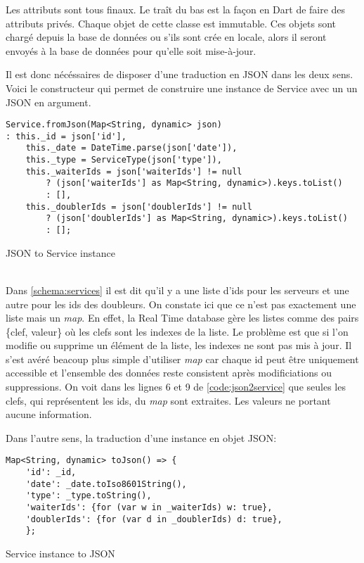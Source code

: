 Les attributs sont tous finaux. Le traît du bas est la façon en Dart de faire des attributs privés. Chaque objet de cette classe est immutable. Ces objets sont chargé depuis la base de données ou s'ils sont crée en locale, alors il seront envoyés à la base de données pour qu'elle soit mise-à-jour. 

Il est donc nécéssaires de disposer d'une traduction en JSON dans les deux sens. Voici le constructeur qui permet de construire une instance de Service avec un un JSON en argument.\\
\begin{listing}[!h]
\begin{verbatim}
Service.fromJson(Map<String, dynamic> json)
: this._id = json['id'],
    this._date = DateTime.parse(json['date']),
    this._type = ServiceType(json['type']),
    this._waiterIds = json['waiterIds'] != null
        ? (json['waiterIds'] as Map<String, dynamic>).keys.toList()
        : [],
    this._doublerIds = json['doublerIds'] != null
        ? (json['doublerIds'] as Map<String, dynamic>).keys.toList()
        : [];
\end{verbatim}
\caption{JSON to Service instance}
\label{code:json2service}
\end{listing}\\
Dans \ref{schema:services} il est dit qu'il y a une liste d'ids pour les serveurs et une autre pour les ids des doubleurs. On constate ici que ce n'est pas exactement une liste mais un \textit{map}. En effet, la Real Time database gère les listes comme des pairs \{clef, valeur\} où les clefs sont les indexes de la liste. Le problème est que si l'on modifie ou supprime un élément de la liste, les indexes ne sont pas mis à jour. Il s'est avéré beacoup plus simple d'utiliser \textit{map} car chaque id peut être uniquement accessible et l'ensemble des données reste consistent après modificiations ou suppressions. On voit dans les lignes 6 et 9 de \ref{code:json2service} que seules les clefs, qui représentent les ids, du \textit{map} sont extraites. Les valeurs ne portant aucune information. 

Dans l'autre sens, la traduction d'une instance en objet JSON:

\begin{listing}[!h]
\begin{verbatim}
Map<String, dynamic> toJson() => {
    'id': _id,
    'date': _date.toIso8601String(),
    'type': _type.toString(),
    'waiterIds': {for (var w in _waiterIds) w: true},
    'doublerIds': {for (var d in _doublerIds) d: true},
    };
\end{verbatim}
\caption{Service instance to JSON}
\label{code:service2json}
\end{listing}

